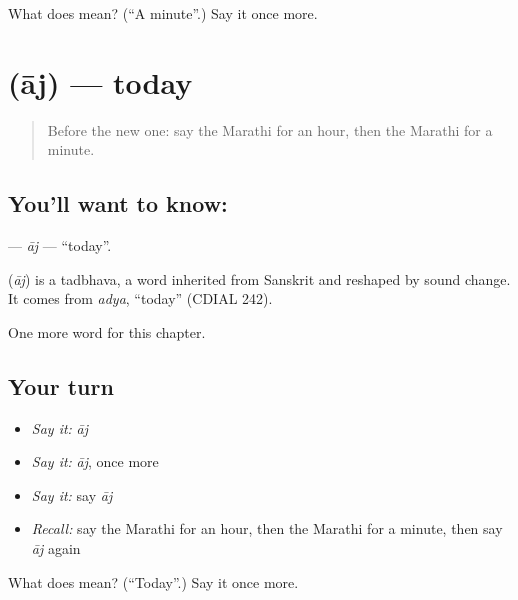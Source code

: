 \begin{tcolorbox}[breakable,colback=teal!4,colframe=teal!35!black,title={Before you move on}]
What does  mean? (\textquotedblleft{}A minute\textquotedblright{}.) Say it once more.
\end{tcolorbox}
\section[\texorpdfstring{\mr{आज} (āj)}{आज (āj)}]{ (āj) — today}

\label{lesson:MR-C110-aj}



\begin{quote}
Before the new one: say the Marathi for an hour, then the Marathi for a minute.
\end{quote}

\subsection*{You'll want to know: }
\textbf{} — \emph{āj} — \textquotedblleft{}today\textquotedblright{}.

\begin{cousinweb}
\textbf{} (\emph{āj}) is a tadbhava, a word inherited from Sanskrit and reshaped by sound change. It comes from \emph{adya}, \textquotedblleft{}today\textquotedblright{} (CDIAL 242).
\end{cousinweb}

\begin{grammarlens}[title={What you've built}]
One more word for this chapter.
\end{grammarlens}

\subsection*{Your turn}
\begin{itemize}
\raggedright
  \item \emph{Say it:} \emph{āj}
  \item \emph{Say it:} \emph{āj}, once more
  \item \emph{Say it:} say \emph{āj}
  \item \emph{Recall:} say the Marathi for an hour, then the Marathi for a minute, then say \emph{āj} again
\end{itemize}

\begin{tcolorbox}[breakable,colback=teal!4,colframe=teal!35!black,title={Before you move on}]
What does  mean? (\textquotedblleft{}Today\textquotedblright{}.) Say it once more.
\end{tcolorbox}
